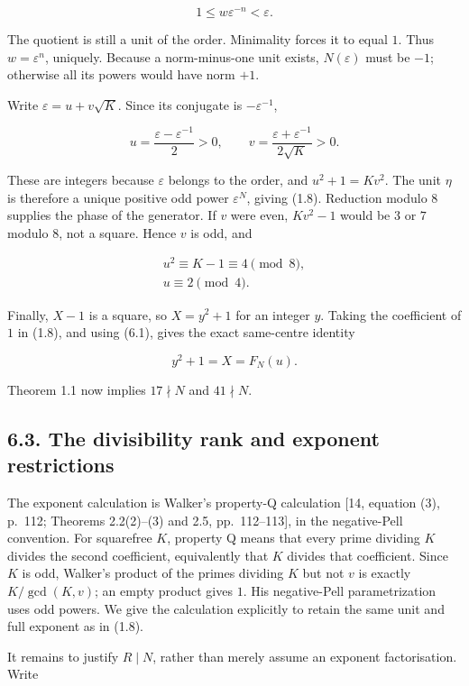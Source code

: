 \documentclass[11pt,a4paper]{article}
\begin{document}
\[
1\le w\varepsilon^{-n}<\varepsilon.
\]

The quotient is still a unit of the order. Minimality forces it to equal
\(1\). Thus \(w=\varepsilon^n\), uniquely. Because a norm-minus-one unit
exists, \(N(\varepsilon)\) must be \(-1\); otherwise all its powers
would have norm \(+1\).

Write \(\varepsilon=u+v\sqrt K\). Since its conjugate is
\(-\varepsilon^{-1}\),

\[
u=\frac{\varepsilon-\varepsilon^{-1}}2>0,
\qquad
v=\frac{\varepsilon+\varepsilon^{-1}}{2\sqrt K}>0.
\]

These are integers because \(\varepsilon\) belongs to the order, and
\(u^2+1=Kv^2\). The unit \(\eta\) is therefore a unique positive odd
power \(\varepsilon^N\), giving (1.8). Reduction modulo \(8\) supplies
the phase of the generator. If \(v\) were even, \(Kv^2-1\) would be
\(3\) or \(7\) modulo \(8\), not a square. Hence \(v\) is odd, and

\[
\begin{gathered}
u^2\equiv K-1\equiv4\pmod8,\\
u\equiv2\pmod4.
\end{gathered}
\tag{6.3}
\]

Finally, \(X-1\) is a square, so \(X=y^2+1\) for an integer \(y\).
Taking the coefficient of \(1\) in (1.8), and using (6.1), gives the
exact same-centre identity

\[
y^2+1=X=F_N(u).
\tag{6.4}
\]

Theorem 1.1 now implies \(17\nmid N\) and \(41\nmid N\).

\subsection{6.3. The divisibility rank and exponent
restrictions}\label{rank}

The exponent calculation is Walker's property-Q calculation {[}14,
equation (3), p.~112; Theorems 2.2(2)--(3) and 2.5, pp.~112--113{]}, in
the negative-Pell convention. For squarefree \(K\), property Q means
that every prime dividing \(K\) divides the second coefficient,
equivalently that \(K\) divides that coefficient. Since \(K\) is odd,
Walker's product of the primes dividing \(K\) but not \(v\) is exactly
\(K/\gcd(K,v)\); an empty product gives \(1\). His negative-Pell
parametrization uses odd powers. We give the calculation explicitly to
retain the same unit and full exponent as in (1.8).

It remains to justify \(R\mid N\), rather than merely assume an exponent
factorisation. Write
\end{document}
